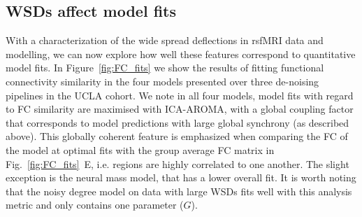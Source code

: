 \documentclass[oneside]{zHenriquesLab-StyleBioRxiv}
\begin{document}
\subsection*{WSDs affect model fits}
With a characterization of the wide spread deflections in rsfMRI data and modelling, we can now explore how well these features correspond to quantitative model fits. In Figure~\ref{fig:FC_fits} we show the results of fitting functional connectivity similarity in the four models presented over three de-noising pipelines in the UCLA cohort. We note in all four models, model fits with regard to FC similarity are maximised with ICA-AROMA, with a global coupling factor that corresponds to model predictions with large global synchrony (as described above). This globally coherent feature is emphasized when comparing the FC of the model at optimal fits with the group average FC matrix in Fig.~\ref{fig:FC_fits}~E, i.e. regions are highly correlated to one another. The slight exception is the neural mass model, that has a lower overall fit. It is worth noting that the noisy degree model on data with large WSDs fits well with this analysis metric and only contains one parameter ($G$). 
\end{document}
